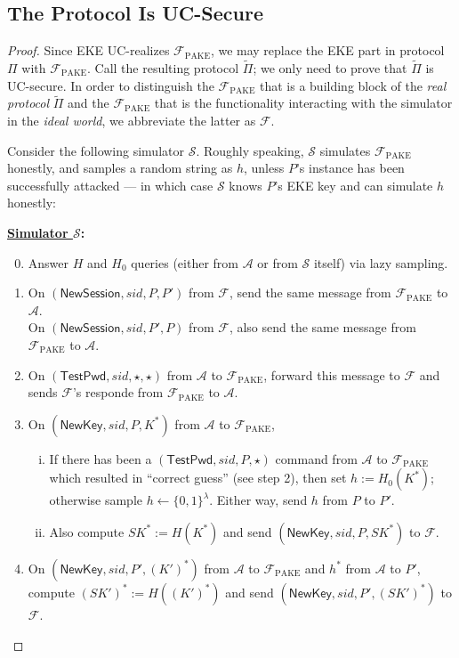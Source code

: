 \documentclass{article}
\newcommand{\adv}{\mathcal{A}}
\renewcommand{\sim}{\mathcal{S}}
\newcommand{\func}{\mathcal{F}}
\newcommand{\Fpake}{\func_\mathrm{PAKE}}
\newcommand{\NewSession}{\mathsf{NewSession}}
\newcommand{\TestPwd}{\mathsf{TestPwd}}
\newcommand{\NewKey}{\mathsf{NewKey}}
\begin{document}
\subsection{The Protocol Is UC-Secure}
\begin{proof}
Since EKE UC-realizes $\Fpake$, we may replace the EKE part in protocol $\Pi$ with $\Fpake$. Call the resulting protocol $\tilde{\Pi}$; we only need to prove that $\tilde{\Pi}$ is UC-secure. In order to distinguish the $\Fpake$ that is a building block of the \emph{real protocol} $\tilde{\Pi}$ and the $\Fpake$ that is the functionality interacting with the simulator in the \emph{ideal world}, we abbreviate the latter as $\func$.

Consider the following simulator $\sim$. Roughly speaking, $\sim$ simulates $\Fpake$ honestly, and samples a random string as $h$, unless $P$'s instance has been successfully attacked --- in which case $\sim$ knows $P$'s EKE key and can simulate $h$ honestly:

\bigskip\noindent\textbf{\underline{Simulator $\sim$}:}
\begin{enumerate}
\setcounter{enumi}{-1}
  \item Answer $H$ and $H_0$ queries (either from $\adv$ or from $\sim$ itself) via lazy sampling.
  \item On $(\NewSession, sid, P, P')$ from $\func$, send the same message from $\Fpake$ to $\adv$. \\
      On $(\NewSession, sid, P', P)$ from $\func$, also send the same message from $\Fpake$ to $\adv$.
  \item On $(\TestPwd, sid, \star, \star)$ from $\adv$ to $\Fpake$, forward this message to $\func$ and sends $\func$'s responde from $\Fpake$ to $\adv$.
  \item On $(\NewKey, sid, P, K^*)$ from $\adv$ to $\Fpake$,
      \begin{enumerate}[(i)]
        \item If there has been a $(\TestPwd, sid, P, \star)$ command from $\adv$ to $\Fpake$ which resulted in ``correct guess'' (see step 2), then set $h := H_0(K^*)$; otherwise sample $h \gets \{0,1\}^\lambda$. Either way, send $h$ from $P$ to $P'$.
        \item Also compute $SK^* := H(K^*)$ and send $(\NewKey, sid, P, SK^*)$ to $\func$.
      \end{enumerate}
  \item On $(\NewKey, sid, P', (K')^*)$ from $\adv$ to $\Fpake$ and $h^*$ from $\adv$ to $P'$, compute $(SK')^* := H((K')^*)$ and send $(\NewKey, sid, P', (SK')^*)$ to $\func$.
\end{enumerate}


\end{proof}
\end{document}
